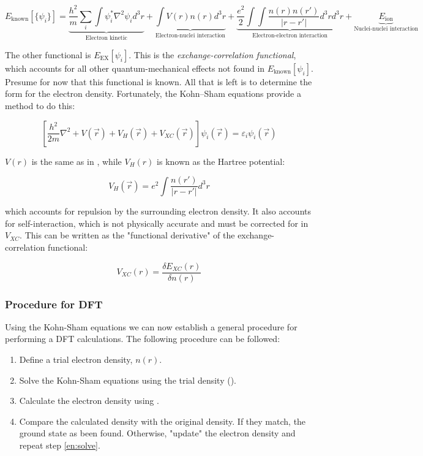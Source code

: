 \begin{equation}
E_{\text{known}}[\{\psi_i\}] =
\underbrace{\frac{h^2}{m}\sum_i\int \psi_i^*\nabla^2\psi_id^3
r}_{\text{Electron kinetic}} +
\underbrace{\int V(r)n(r)d^3r}_{\text{Electron-nuclei interaction}} +
\underbrace{\frac{e^2}{2}\int\int\frac{n(r)n(r')}{|r - r'|}d^3r d^3
r}_{\text{Electron-electron interaction}} +
\underbrace{E_{\text{ion}}}_{\text{Nuclei-nuclei interaction}}
\label{eq:known}
\end{equation}

\noindent The other functional is $E_{\text{EX}}[\psi_i]$. This is the
\textit{exchange-correlation functional}, which accounts for all other
quantum-mechanical effects not found in $E_{\text{known}}[\psi_i]$. Presume for
now that this functional is known. All that is left is to determine the form
for the electron density. Fortunately, the Kohn--Sham equations provide a method
to do this:

\begin{equation}
\left[ \frac{h^2}{2m}\nabla^2 + V(\vec r) + V_H(\vec r) + V_{XC}(\vec r)
\right]\psi_i(\vec r) = \varepsilon_i\psi_i(\vec r)
\label{eq:kohn-sham}
\end{equation}

$V(r)$ is the same as in , while $V_H(r)$ is known as the Hartree
potential:

\begin{equation}
V_H(\vec r) = e^2 \int\frac{n(r')}{|r - r'|} d^3r
\end{equation}

\noindent which accounts for repulsion by the surrounding electron density. It
also accounts for self-interaction, which is not physically accurate and must be
corrected for in $V_{XC}$. This can be written as the "functional derivative" of
the exchange-correlation functional:

\begin{equation}
V_{XC}(r) = \frac{\delta E_{XC}(r)}{\delta n(r)}
\label{eq:Vxc}
\end{equation}

\subsubsection{Procedure for DFT}

Using the Kohn-Sham equations we can now establish a general procedure for
performing a DFT calculations. The following procedure can be followed:

\begin{enumerate}
\item Define a trial electron density, $n(r)$.
\item Solve the Kohn-Sham equations using the trial density
  (). \label{en:solve}
\item Calculate the electron density using .
\item Compare the calculated density with the original density. If they match,
  the ground state as been found. Otherwise, "update" the electron
  density and repeat step
  \ref{en:solve}.
\end{enumerate}

